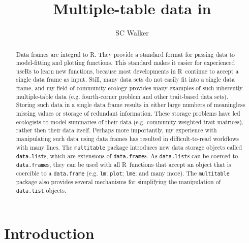 \documentclass{article}
\title{Multiple-table data in \R}
\author{SC Walker}
\newcommand{\R}{{\sf R}}
\newcommand{\code}[1]{\texttt{#1}}
\numberwithin{exercise}{section}
\begin{document}
\maketitle



\begin{abstract}
Data frames are integral to \R.  They provide a standard format for passing data to model-fitting and plotting functions.  This standard makes it easier for experienced use\R s to learn new functions, because most developments in \R\ continue to accept a single data frame as input.  Still, many data sets do not easily fit into a single data frame, and my field of community ecology provides many examples of such inherently multiple-table data (e.g. fourth-corner problem and other trait-based data sets).  Storing such data in a single data frame results in either large numbers of meaningless missing values or storage of redundant information.  These storage problems have led ecologists to model summaries of their data (e.g. community-weighted trait matrices), rather then their data itself.  Perhaps more importantly, my experience with manipulating such data using data frames has resulted in difficult-to-read workflows with many lines.  The \code{multitable} package introduces new data storage objects called \code{data.list}s, which are extensions of \code{data.frame}s.  As \code{data.list}s can be coerced to \code{data.frame}s, they can be used with all \R\ functions that accept an object that is coercible to a \code{data.frame} (e.g. \code{lm}; \code{plot}; \code{lme}; and many more).  The \code{multitable} package also provides several mechanisms for simplifying the manipulation of \code{data.list} objects.
\end{abstract}

\section{Introduction}
\end{document}
